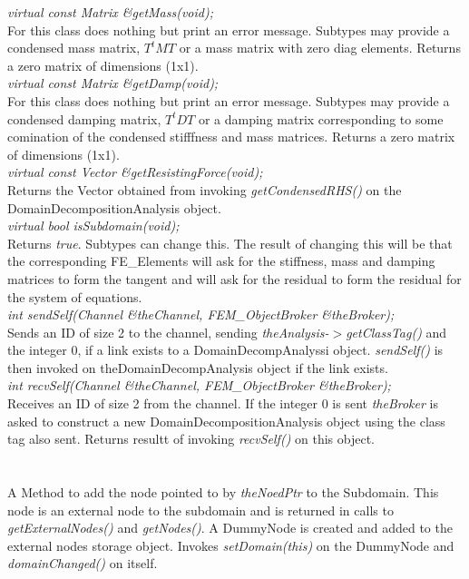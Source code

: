 {\em virtual const Matrix \&getMass(void);    }\\
For this class does nothing but print an error message. Subtypes may
provide a condensed mass matrix, $T^tMT$ or a mass matrix with zero
diag elements. Returns a zero matrix of dimensions (1x1). \\

{\em virtual const Matrix \&getDamp(void);    }\\
For this class does nothing but print an error message. Subtypes may
provide a condensed damping matrix, $T^tDT$ or a damping matrix
corresponding to some comination of the condensed stifffness and mass
matrices. Returns a zero matrix of dimensions (1x1). \\

{\em virtual const Vector \&getResistingForce(void);}\\
Returns the Vector obtained from invoking {\em getCondensedRHS()} on
the DomainDecompositionAnalysis object. \\

{\em virtual bool isSubdomain(void);}\\
Returns {\em true}. Subtypes can change this. The result of changing
this will be that the corresponding FE\_Elements will ask for the
stiffness, mass and damping matrices to form the tangent and will ask
for the residual to form the residual for the system of equations. \\

{\em int sendSelf(Channel \&theChannel, FEM\_ObjectBroker \&theBroker);}\\
Sends an ID of size 2 to the channel, sending {\em theAnalysis-$>$getClassTag()} and the integer $0$,
if a link exists to a DomainDecompAnalyssi object. 
{\em sendSelf()} is then invoked on theDomainDecompAnalysis object if the link exists. \\

{\em int recvSelf(Channel \&theChannel, FEM\_ObjectBroker \&theBroker);}\\
Receives an ID of size 2 from the channel. If the integer $0$ is sent {\em theBroker}
is asked to construct a new DomainDecompositionAnalysis object using the class tag also sent.
Returns resultt of invoking {\em recvSelf()} on this object. \\

 \\
 \\
A Method to add the node pointed to by {\em theNoedPtr} to the
Subdomain. This node is an external node to the subdomain and is
returned in calls to {\em getExternalNodes()} and {\em
getNodes()}. A DummyNode is created and added to the external nodes storage object. 
Invokes {\em setDomain(this)} on the DummyNode and {\em domainChanged()} on itself.\\

